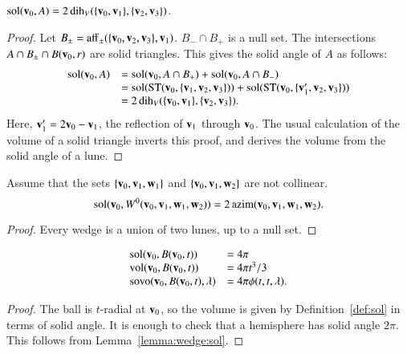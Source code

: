\begin{lemma}  $\operatorname{sol}({\mathbf v}_0,A) = 2\operatorname{dih}_V(\{{\mathbf v}_0,{\mathbf v}_1\},\{{\mathbf v}_2,{\mathbf v}_3\})$.
\end{lemma}

\begin{proof}
Let $B_{\pm} = {\operatorname{aff}}_\pm(\{{\mathbf v}_0,{\mathbf v}_2,{\mathbf v}_3\},{\mathbf v}_1)$.  $B_- \cap B_+$
is a null set.  The intersections $A\cap B_{\pm}\cap B({\mathbf v}_0,r)$ 
are solid triangles.  This gives the solid angle of $A$ as
follows:
   $$\begin{array}{lll}
   \operatorname{sol}({\mathbf v}_0,A) &= \operatorname{sol}({\mathbf v}_0,A\cap B_+)+\operatorname{sol}({\mathbf v}_0,A\cap B_-) \\
   &= 
   \operatorname{sol}({\operatorname{ST}}({\mathbf v}_0,\{{\mathbf v}_1,{\mathbf v}_2,{\mathbf v}_3\})) + \operatorname{sol}({\operatorname{ST}}({\mathbf v}_0,\{{\mathbf v}_1',{\mathbf v}_2,{\mathbf v}_3\})) \\
   &=
   2\operatorname{dih}_V(\{{\mathbf v}_0,{\mathbf v}_1\},\{{\mathbf v}_2,{\mathbf v}_3\}).
   \end{array}
   $$
Here,  ${\mathbf v}_1'= 2 {\mathbf v}_0 - {\mathbf v}_1$, the reflection of ${\mathbf v}_1$
through ${\mathbf v}_0$.  The usual calculation of the volume of a solid triangle
inverts this proof, 
and derives the volume from the solid angle of a lune.
\end{proof}



\begin{lemma} 
Assume that the sets $\{{\mathbf v}_0,{\mathbf v}_1,{\mathbf w}_1\}$ and
$\{{\mathbf v}_0,{\mathbf v}_1,{\mathbf w}_2\}$ are not collinear. 
$$\operatorname{sol}({\mathbf v}_0,W^0({\mathbf v}_0,{\mathbf v}_1,{\mathbf w}_1,{\mathbf w}_2)) = 2\,{\operatorname{azim}}({\mathbf v}_0,{\mathbf v}_1,{\mathbf w}_1,{\mathbf w}_2).$$
%
\end{lemma}    

\begin{proof} Every wedge is a union of two lunes, up to a null set.
\end{proof}

\begin{lemma}  
   $$
   \begin{array}{lll}
    {\operatorname{sol}}({\mathbf v}_0,B({\mathbf v}_0,t)) &= 4\pi\\
    {\operatorname{vol}}({\mathbf v}_0,B({\mathbf v}_0,t)) &= 4\pi t^3/3\\
    {\operatorname{sovo}}({\mathbf v}_0,B({\mathbf v}_0,t),\lambda) &= 4 \pi \phi(t,t,\lambda).
   \end{array}
   $$
\end{lemma}

\begin{proof}
The ball is $t$-radial at ${\mathbf v}_0$, so the volume is given by
Definition~\ref{def:sol} in terms of solid angle.  It is enough
to check that a hemisphere has solid angle $2\pi$.  This follows
from Lemma~\ref{lemma:wedge:sol}.
\end{proof}  




